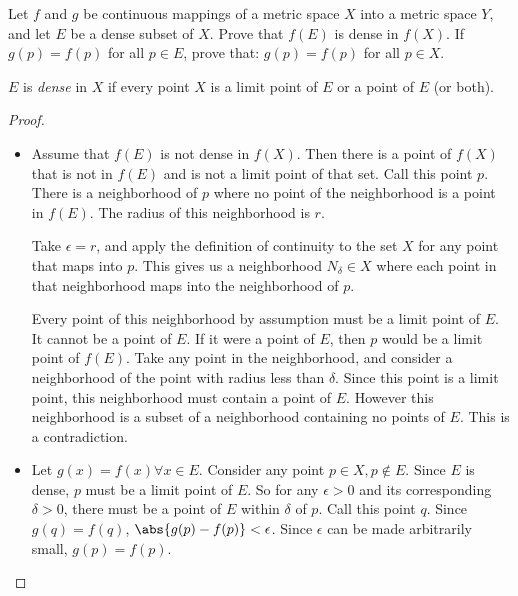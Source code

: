\documentclass[12pt, letterpaper]{paper}
\begin{document}
\begin{question}
  Let $f$ and $g$ be continuous mappings of a metric space $X$ into a
  metric space $Y$, and let $E$ be a dense subset of $X$. Prove that
  $f(E)$ is dense in $f(X)$. If $g(p) = f(p)$ for all $p \in E$, prove
  that: $g(p) = f(p)$ for all $p \in X$.

  $E$ is \emph{dense} in $X$ if every point $X$ is a limit point of
  $E$ or a point of $E$ (or both).
  \begin{proof}
    \begin{itemize}
    \item Assume that $f(E)$ is not dense in $f(X)$. Then there is a
      point of $f(X)$ that is not in $f(E)$ and is not a limit point
      of that set. Call this point $p$. There is a neighborhood of $p$
      where no point of the neighborhood is a point in $f(E)$. The
      radius of this neighborhood is $r$.

      Take $\epsilon = r$, and apply the definition of continuity to the set
      $X$ for any point that maps into $p$. This gives us a
      neighborhood $N_\delta \in X$ where each point in that neighborhood
      maps into the neighborhood of $p$.

      Every point of this neighborhood by assumption must be a limit
      point of $E$. It cannot be a point of $E$. If it were a point of
      $E$, then $p$ would be a limit point of $f(E)$. Take any point
      in the neighborhood, and consider a neighborhood of the point
      with radius less than $\delta$. Since this point is a limit point,
      this neighborhood must contain a point of $E$. However this
      neighborhood is a subset of a neighborhood containing no points
      of $E$. This is a contradiction.

    \item Let $g(x) = f(x) \forall x \in E$. Consider any point $p \in X, p \notin
      E$. Since $E$ is dense, $p$ must be a limit point of $E$. So for
      any $\epsilon > 0$ and its corresponding $\delta > 0$, there must be a point
      of $E$ within $\delta$ of $p$. Call this point $q$. Since $g(q) =
      f(q)$, $\abs{g(p)-f(p)} < \epsilon$. Since $\epsilon$ can be made arbitrarily
      small, $g(p) = f(p)$.
    \end{itemize}
  \end{proof}
\end{question}
\end{document}
